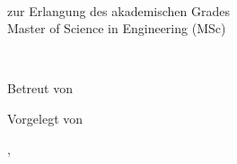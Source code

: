 \begin{titlepage}

\begin{center}

\vspace*{30mm}

{\LARGE\bfseries\mytitle}

\vspace{5mm}

{\bfseries\myworktitle}

\end{center}

\vfill

\begin{flushright}

\vspace*{15mm}

\mykindofthesis\\
zur Erlangung des akademischen Grades\\
\vspace*{2mm}
Master of Science in Engineering (MSc)

\vspace{20mm}

\myuniversity\\
\mydepartment

\vspace*{10mm}

Betreut von\\
\mysupervisor

\vspace*{10mm}

Vorgelegt von\\
\myauthor

\vfill

\mysubmissiontown, \mysubmissionyear

\end{flushright}

\end{titlepage}